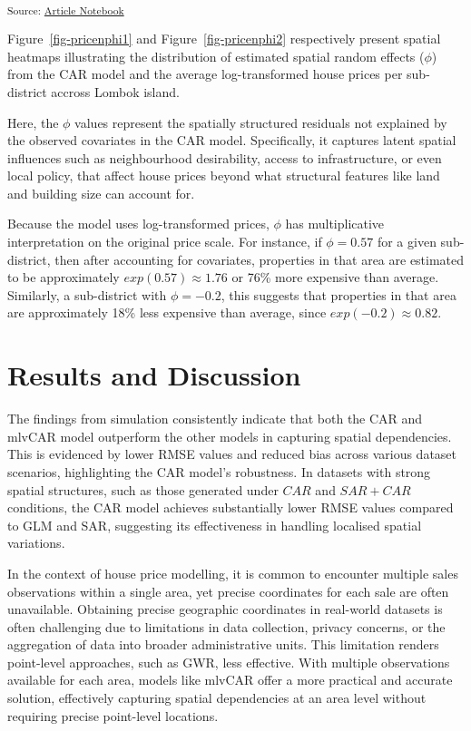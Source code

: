 \documentclass[
  default,
]{sn-jnl}
\begin{document}
\textsubscript{Source:
\href{https://indiraputeri-phd.github.io/CAR_simcomp/manuscript.qmd.html}{Article
Notebook}}

Figure~\ref{fig-pricenphi1} and Figure~\ref{fig-pricenphi2} respectively
present spatial heatmaps illustrating the distribution of estimated
spatial random effects (\(\phi\)) from the CAR model and the average
log-transformed house prices per sub-district accross Lombok island.

Here, the \(\phi\) values represent the spatially structured residuals
not explained by the observed covariates in the CAR model. Specifically,
it captures latent spatial influences such as neighbourhood
desirability, access to infrastructure, or even local policy, that
affect house prices beyond what structural features like land and
building size can account for.

Because the model uses log-transformed prices, \(\phi\) has
multiplicative interpretation on the original price scale. For instance,
if \(\phi = 0.57\) for a given sub-district, then after accounting for
covariates, properties in that area are estimated to be approximately
\(exp(0.57) \approx 1.76\) or 76\% more expensive than average.
Similarly, a sub-district with \(\phi = -0.2\), this suggests that
properties in that area are approximately 18\% less expensive than
average, since \(exp(-0.2) \approx 0.82\).

\section{Results and Discussion}\label{results-and-discussion}

The findings from simulation consistently indicate that both the CAR and
mlvCAR model outperform the other models in capturing spatial
dependencies. This is evidenced by lower RMSE values and reduced bias
across various dataset scenarios, highlighting the CAR model's
robustness. In datasets with strong spatial structures, such as those
generated under \(CAR\) and \(SAR + CAR\) conditions, the CAR model
achieves substantially lower RMSE values compared to GLM and SAR,
suggesting its effectiveness in handling localised spatial variations.

In the context of house price modelling, it is common to encounter
multiple sales observations within a single area, yet precise
coordinates for each sale are often unavailable. Obtaining precise
geographic coordinates in real-world datasets is often challenging due
to limitations in data collection, privacy concerns, or the aggregation
of data into broader administrative units. This limitation renders
point-level approaches, such as GWR, less effective. With multiple
observations available for each area, models like mlvCAR offer a more
practical and accurate solution, effectively capturing spatial
dependencies at an area level without requiring precise point-level
locations.
\end{document}
